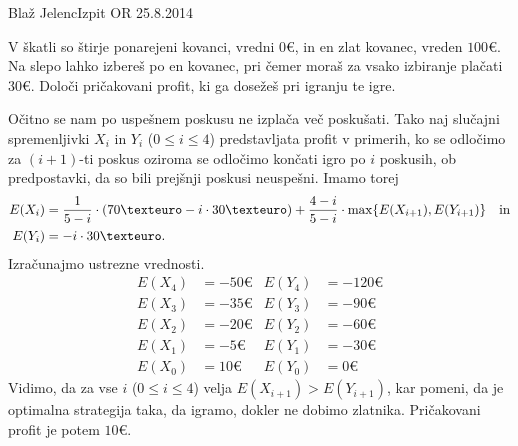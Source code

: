 \begin{naloga}{Blaž Jelenc}{Izpit OR 25.8.2014}
\begin{vprasanje}
V škatli so štirje ponarejeni kovanci, vredni $0 €$,
in en zlat kovanec, vreden $100 €$.
Na slepo lahko izbereš po en kovanec,
pri čemer moraš za vsako izbiranje plačati $30 €$.
Določi pričakovani profit, ki ga dosežeš pri igranju te igre.
\end{vprasanje}

\begin{odgovor}
Očitno se nam po uspešnem poskusu ne izplača več poskušati.
Tako naj slučajni spremenljivki $X_i$ in $Y_i$ ($0 \le i \le 4$)
predstavljata profit v primerih,
ko se odločimo za $(i+1)$-ti poskus
oziroma se odločimo končati igro po $i$ poskusih,
ob predpostavki, da so bili prejšnji poskusi neuspešni.
Imamo torej
\begin{align*}
E(X_i) &= {1 \over 5-i} \cdot (70 € - i \cdot 30 €)
    + {4-i \over 5-i} \cdot \max\{E(X_{i+1}), E(Y_{i+1})\}
\quad \text{in} \\
E(Y_i) &= -i \cdot 30 € .
\end{align*}
Izračunajmo ustrezne vrednosti.
\begin{align*}
E(X_4) &= -50 € & E(Y_4) &= -120 € \\
E(X_3) &= -35 € & E(Y_3) &= -90 € \\
E(X_2) &= -20 € & E(Y_2) &= -60 € \\
E(X_1) &=  -5 € & E(Y_1) &= -30 € \\
E(X_0) &=  10 € & E(Y_0) &=   0 €
\end{align*}
Vidimo, da za vse $i$ ($0 \le i \le 4$) velja $E(X_{i+1}) > E(Y_{i+1})$,
kar pomeni, da je optimalna strategija taka,
da igramo, dokler ne dobimo zlatnika.
Pričakovani profit je potem $10 €$.
\end{odgovor}
\end{naloga}
